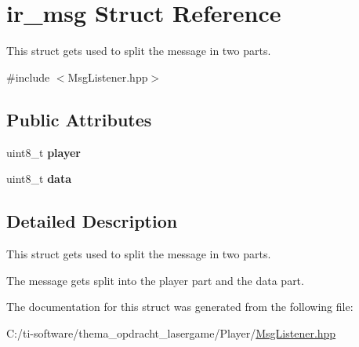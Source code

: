 \hypertarget{structir__msg}{}\section{ir\+\_\+msg Struct Reference}
\label{structir__msg}


This struct gets used to split the message in two parts.  




{\ttfamily \#include $<$Msg\+Listener.\+hpp$>$}

\subsection*{Public Attributes}
\begin{DoxyCompactItemize}
\item 
\mbox{\label{structir__msg_a1aba19ec600f05dbf3e20cd94585f2b7}} 
uint8\+\_\+t {\bfseries player}
\item 
\mbox{\label{structir__msg_a186ea1a98c46be88a9664b2ca285566f}} 
uint8\+\_\+t {\bfseries data}
\end{DoxyCompactItemize}


\subsection{Detailed Description}
This struct gets used to split the message in two parts. 

The message gets split into the player part and the data part. 

The documentation for this struct was generated from the following file\+:\begin{DoxyCompactItemize}
\item 
C\+:/ti-\/software/thema\+\_\+opdracht\+\_\+lasergame/\+Player/\mbox{\hyperlink{_msg_listener_8hpp}{Msg\+Listener.\+hpp}}\end{DoxyCompactItemize}
